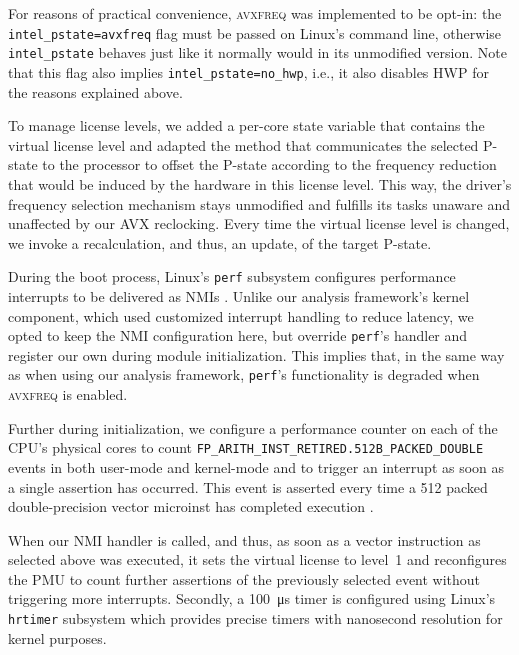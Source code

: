 For reasons of practical convenience, \textsc{avxfreq} was implemented to be opt-in: the \texttt{intel\_pstate=avxfreq} flag must be passed on Linux's command line, otherwise \texttt{intel\_pstate} behaves just like it normally would in its unmodified version. Note that this flag also implies \texttt{intel\_pstate=no\_hwp}, i.e., it also disables \gls{HWP} for the reasons explained above.

To manage license levels, we added a per-core state variable that contains the virtual license level and adapted the method that communicates the selected \gls{P-state} to the processor to offset the \gls{P-state} according to the frequency reduction that would be induced by the hardware in this license level. This way, the driver's frequency selection mechanism stays unmodified and fulfills its tasks unaware and unaffected by our \gls{AVX} reclocking. Every time the virtual license level is changed, we invoke a recalculation, and thus, an update, of the target \gls{P-state}.

During the boot process, Linux's \texttt{perf} subsystem configures performance interrupts to be delivered as \glspl{NMI} \cite{kernelx86eventscore}. Unlike our analysis framework's kernel component, which used customized interrupt handling to reduce latency, we opted to keep the \gls{NMI} configuration here, but override \texttt{perf}'s handler and register our own during module initialization. This implies that, in the same way as when using our analysis framework, \texttt{perf}'s functionality is degraded when \textsc{avxfreq} is enabled.

Further during initialization, we configure a performance counter on each of the \gls{CPU}'s physical cores to count  \texttt{FP\_ARITH\_INST\_RETIRED.512B\_PACKED\_DOUBLE} events in both user-mode and kernel-mode and to trigger an interrupt as soon as a single assertion has occurred. This event is asserted every time a \SI{512}{\bit} packed double-precision vector \gls{microinst} has completed execution \cite{intelsdmsysprogguide}.

When our \gls{NMI} handler is called, and thus, as soon as a vector instruction as selected above was executed, it sets the virtual license to level~1 and reconfigures the \gls{PMU} to count further assertions of the previously selected event without triggering more interrupts. Secondly, a \SI{100}{\micro\second} timer is configured using Linux's \texttt{hrtimer} subsystem which provides precise timers with nanosecond resolution for kernel purposes.

